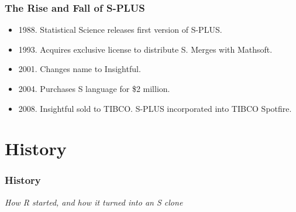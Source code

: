 \documentclass[svgnames]{beamer}
\begin{document}
\begin{frame}
  \frametitle{The Rise and Fall of S-PLUS}
    
  \begin{itemize}
  \item 1988. Statistical Science releases first version of S-PLUS.
  \item 1993. Acquires exclusive license to distribute S. Merges with Mathsoft.
  \item 2001. Changes name to Insightful.
  \item 2004. Purchases S language for \$2 million.
  \item 2008. Insightful sold to TIBCO. S-PLUS incorporated into TIBCO Spotfire.
  \end{itemize}

\end{frame}

\section{History}

\begin{frame}
  \frametitle{History}

  \begin{center}
    {\em How R started, and how it turned into an S clone}
  \end{center}

\end{frame}
\end{document}
